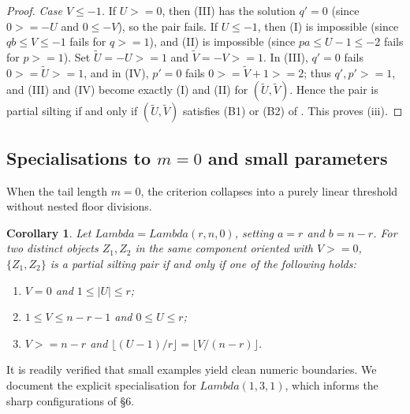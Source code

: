 \documentclass[11pt, a4paper]{article}
\newtheorem{corollary}[theorem]{Corollary}
\theoremstyle{definition}
\def\Lambda{Lambda}%
\def\ge{>=}%
\begin{document}
\begin{proof}
\emph{Case $V\le-1$.} If $U\ge0$, then \textup{(III)} has the solution $q'=0$ (since $0\ge -U$ and $0\le -V$), so the pair fails. If $U\le-1$, then \textup{(I)} is impossible (since $qb\le V\le-1$ fails for $q\ge1$), and \textup{(II)} is impossible (since $pa\le U-1\le-2$ fails for $p\ge1$). Set $\widetilde U=-U\ge1$ and $\widetilde V=-V\ge1$. In \textup{(III)}, $q'=0$ fails $0 \ge \widetilde U \ge 1$, and in \textup{(IV)}, $p'=0$ fails $0 \ge \widetilde V + 1 \ge 2$; thus $q', p' \ge 1$, and \textup{(III)} and \textup{(IV)} become exactly \textup{(I)} and \textup{(II)} for $(\widetilde U,\widetilde V)$. Hence the pair is partial silting if and only if $(\widetilde U,\widetilde V)$ satisfies \textup{(B1)} or \textup{(B2)} of . This proves (iii).
\end{proof}


\subsection{Specialisations to \texorpdfstring{$m=0$}{m=0} and small parameters}\label{subsec:pairwise-spec}

When the tail length $m=0$, the criterion collapses into a purely linear threshold without nested floor divisions.

\begin{corollary}\label{cor:case-m0}
Let $\Lambda = \Lambda(r,n,0)$, setting $a=r$ and $b=n-r$. For two distinct objects $Z_1, Z_2$ in the same component oriented with $V \ge 0$, $\{Z_1, Z_2\}$ is a partial silting pair if and only if one of the following holds:
\begin{enumerate}[label=\textup{(\Alph*)}]
  \item $V = 0$ and $1 \le |U| \le r$;
  \item $1 \le V \le n-r-1$ and $0 \le U \le r$;
  \item $V \ge n-r$ and $\lfloor (U-1)/r \rfloor = \lfloor V/(n-r) \rfloor$.
\end{enumerate}
\end{corollary}

It is readily verified that small examples yield clean numeric boundaries. We document the explicit specialisation for $\Lambda(1,3,1)$, which informs the sharp configurations of \S 6.
\end{document}
